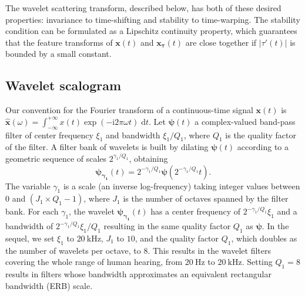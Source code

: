 \documentclass[journal]{IEEEtran}
\begin{document}
The wavelet scattering transform, described below, has both of these desired properties: invariance to time-shifting and stability to time-warping. The stability condition can be formulated as a Lipschitz continuity property, which guarantees that the feature transforms of $\boldsymbol{x}(t)$ and $\boldsymbol{x_\tau}(t)$ are close together if $|\tau'(t)|$ is bounded by a small constant.

\subsection{Wavelet scalogram}
Our convention for the Fourier transform of a continuous-time signal $\boldsymbol{x}(t)$ is $\boldsymbol{\hat{x}}(\omega) = \int_{-\infty}^{+\infty} x(t) \exp(- \mathrm{i} 2\pi \omega t) \; \mathrm{d}t$.
Let $\boldsymbol{\psi}(t)$ a complex-valued band-pass filter of
center frequency $\xi_1$ and bandwidth $\xi_1/Q_1$, where $Q_1$ is the quality factor of the filter.
A filter bank of wavelets is built by dilating $\boldsymbol{\psi}(t)$
according to a geometric sequence of scales $2^{\gamma_1/Q_1}$, obtaining
\begin{equation}
\boldsymbol{\psi_{\gamma_1}}(t) = 2^{-\gamma_1/Q_1} \boldsymbol{\psi}(2^{-\gamma_1/Q_1} t)\mbox{.}
\end{equation}
The variable $\gamma_1$ is a scale (an inverse log-frequency) taking integer values between $0$ and $(J_1 \times Q_1 - 1)$, where $J_1$ is the number of octaves spanned by the filter bank.
For each $\gamma_1$, the wavelet $\boldsymbol{\psi_{\gamma_1}}(t)$
has a center frequency of $2^{-\gamma_1/Q_1}\xi_1$ and a bandwidth of $2^{-\gamma_1/Q_1}\xi_1/Q_1$ resulting in the same quality factor $Q_1$ as $\boldsymbol{\psi}$.
In the sequel, we set $\xi_1$ to $20~\mathrm{kHz}$, $J_1$ to $10$, and the quality factor $Q_1$, which doubles as the number of wavelets per octave, to $8$. This results in the wavelet filters covering the whole range of human hearing, from $20~\mathrm{Hz}$ to $20~\mathrm{kHz}$. Setting $Q_1 = 8$ results in filters whose bandwidth approximates an equivalent rectangular bandwidth (ERB) scale.
\end{document}
